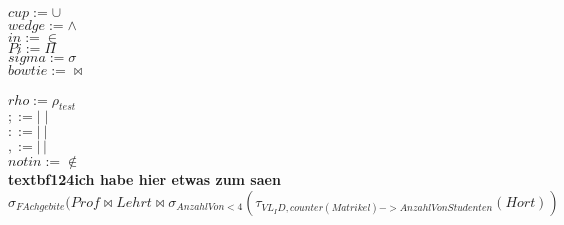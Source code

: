 \documentclass{article}
\begin{document}
$ cup := \cup$\\
$ wedge := \wedge$\\
$in := \in$\\
$ Pi := \Pi$\\
$sigma := \sigma$\\
$bowtie := \bowtie$\\\\
$rho := \rho_{test}$\\
$ ; :=|\;|$\\
$: := |\:|$\\
$, := |\,|$\\
$ notin := \notin$\\
\textbf{textbf124ich habe hier etwas zum saen}\\
\newpage
$	
	\sigma_{FAchgebite}(Prof \bowtie Lehrt \bowtie \sigma_{AnzahlVon < 4}(\tau_{VL_ID, counter(Matrikel) -> AnzahlVonStudenten}(Hort))
$
\end{document}
